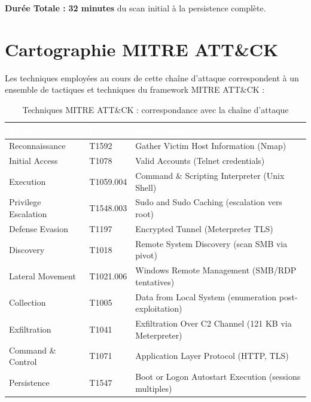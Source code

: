 \documentclass[12pt,a4paper,openany]{report}
\begin{document}
\textbf{Durée Totale :} \textbf{32 minutes} du scan initial à la persistence complète.

\section{Cartographie MITRE ATT\&CK}

Les techniques employées au cours de cette chaîne d'attaque correspondent à un ensemble de tactiques et techniques du framework MITRE ATT\&CK :

\begin{table}[H]
	\centering
	\small
	\renewcommand{\arraystretch}{1.8}
	\setlength{\tabcolsep}{10pt}
	\setlength{\arrayrulewidth}{0.8pt}
	\begin{tabularx}{\textwidth}{|>{\ttfamily}p{3.2cm}|p{2.8cm}|X|}
		\arrayrulecolor{tableborder}
		\hline
		\rowcolor{tableheadbg}
		\textcolor{white}{\textbf{Tactic}} &
		\textcolor{white}{\textbf{ID}}     &
		\textcolor{white}{\textbf{Description}} \\
		\hline
		\rowcolor{tablerowalt}
		Reconnaissance    & T1592     & Gather Victim Host Information (Nmap) \\
		\hline
		Initial Access    & T1078     & Valid Accounts (Telnet credentials) \\
		\hline
		\rowcolor{tablerowalt}
		Execution         & T1059.004 & Command \& Scripting Interpreter (Unix Shell) \\
		\hline
		Privilege Escalation & T1548.003 & Sudo and Sudo Caching (escalation vers root) \\
		\hline
		\rowcolor{tablerowalt}
		Defense Evasion   & T1197     & Encrypted Tunnel (Meterpreter TLS) \\
		\hline
		Discovery         & T1018     & Remote System Discovery (scan SMB via pivot) \\
		\hline
		\rowcolor{tablerowalt}
		Lateral Movement  & T1021.006 & Windows Remote Management (SMB/RDP tentatives) \\
		\hline
		Collection        & T1005     & Data from Local System (enumeration post-exploitation) \\
		\hline
		\rowcolor{tablerowalt}
		Exfiltration      & T1041     & Exfiltration Over C2 Channel (121 KB via Meterpreter) \\
		\hline
		Command \& Control & T1071    & Application Layer Protocol (HTTP, TLS) \\
		\hline
		\rowcolor{tablerowalt}
		Persistence       & T1547     & Boot or Logon Autostart Execution (sessions multiples) \\
		\hline
	\end{tabularx}
	\caption{Techniques MITRE ATT\&CK : correspondance avec la chaîne d'attaque}
	\label{tab:mitre-attack-techniques}
\end{table}
\end{document}
